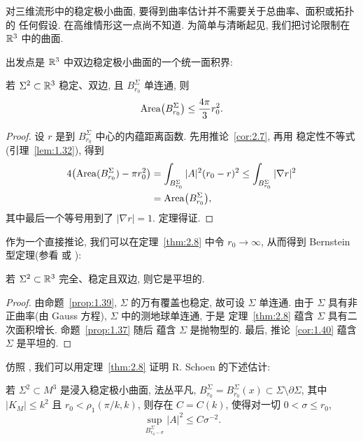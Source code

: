 对三维流形中的稳定极小曲面, 要得到曲率估计并不需要关于总曲率、面积或拓扑的
任何假设. 在高维情形这一点尚不知道. 为简单与清晰起见, 我们把讨论限制在
$\mathbb{R}^3$ 中的曲面.

出发点是 $\mathbb{R}^3$ 中双边稳定极小曲面的一个统一面积界:

\begin{theorem}
\label{thm:2.8}
若 $\Sigma^2\subset\mathbb{R}^3$ 稳定、双边, 且 $B_{r_0}^{\Sigma}$ 单连通, 则
\begin{equation}
\operatorname{Area}\bigl(B_{r_0}^{\Sigma}\bigr)\leq\frac{4\pi}{3}r_0^{2}.
\label{eq:2.61}
\end{equation}
\end{theorem}

\begin{proof}
设 $r$ 是到 $B_{r_0}^{\Sigma}$ 中心的内蕴距离函数. 先用推论~\ref{cor:2.7}, 再用
稳定性不等式(引理~\ref{lem:1.32}), 得到
\begin{equation}
\begin{aligned}
4\bigl(\operatorname{Area}(B_{r_0}^{\Sigma})-\pi r_0^{2}\bigr)
&=\int_{B_{r_0}^{\Sigma}}|A|^{2}(r_0-r)^{2}
 \leq\int_{B_{r_0}^{\Sigma}}|\nabla r|^{2}\\
&=\operatorname{Area}\bigl(B_{r_0}^{\Sigma}\bigr),
\end{aligned}
\label{eq:2.62}
\end{equation}
其中最后一个等号用到了 $|\nabla r|=1$. 定理得证.
\end{proof}

作为一个直接推论, 我们可以在定理~\ref{thm:2.8} 中令 $r_0\to\infty$, 从而得到
Bernstein 型定理(参看 \cite{FiSc} 或 \cite{dCP}):

\begin{corollary}
\label{cor:2.9}
若 $\Sigma^2\subset\mathbb{R}^3$ 完全、稳定且双边, 则它是平坦的.
\end{corollary}

\begin{proof}
由命题~\ref{prop:1.39}, $\Sigma$ 的万有覆盖也稳定, 故可设 $\Sigma$ 单连通.
由于 $\Sigma$ 具有非正曲率(由 Gauss 方程), $\Sigma$ 中的测地球单连通, 于是
定理~\ref{thm:2.8} 蕴含 $\Sigma$ 具有二次面积增长. 命题~\ref{prop:1.37} 随后
蕴含 $\Sigma$ 是抛物型的. 最后, 推论~\ref{cor:1.40} 蕴含 $\Sigma$ 是平坦的.
\end{proof}

仿照 \cite{CM2}, 我们可以用定理~\ref{thm:2.8} 证明 R. Schoen 的下述估计:

\begin{theorem}[\cite{Sc1}]
\label{thm:2.10}
若 $\Sigma^2\subset M^3$ 是浸入稳定极小曲面, 法丛平凡,
$B_{r_0}^{\Sigma}=B_{r_0}^{\Sigma}(x)\subset\Sigma\setminus\partial\Sigma$,
其中 $|K_M|\leq k^{2}$ 且 $r_0<\rho_1(\pi/k,k)$, 则存在 $C=C(k)$, 使得对一切
$0<\sigma\leq r_0$,
\begin{equation}
\sup_{B_{r_0-\sigma}^{\Sigma}}|A|^{2}\leq C\sigma^{-2}.
\label{eq:2.63}
\end{equation}
\end{theorem}

